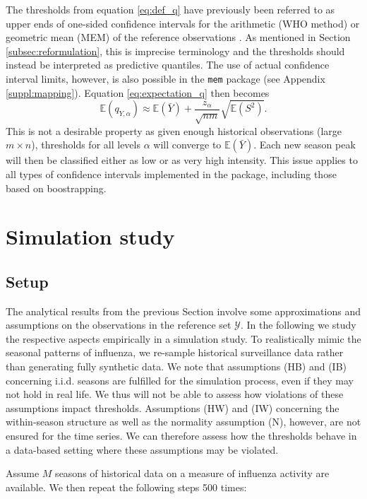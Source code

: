 \documentclass[12pt]{article}
\begin{document}
The thresholds from equation \eqref{eq:def_q} have previously been referred to as upper ends of one-sided confidence intervals for the arithmetic (WHO method) or geometric mean (MEM) of the reference observations \citep{WHO2014, Vega2015}. As mentioned in Section \ref{subsec:reformulation}, this is imprecise terminology and the thresholds should instead be interpreted as predictive quantiles. The use of actual confidence interval limits, however, is also possible in the \texttt{mem} package (see Appendix \ref{suppl:mapping}). Equation \eqref{eq:expectation_q} then becomes
$$
\mathbb{E}(q_{Y, \alpha}) \approx \mathbb{E}(\bar{Y}) + \frac{z_\alpha}{\sqrt{nm}} \sqrt{\mathbb{E}(S^2)}.
$$
This is not a desirable property as given enough historical observations (large $m \times n$), thresholds for all levels $\alpha$ will converge to $\mathbb{E}(\bar{Y})$. Each new season peak will then be classified either as low or as very high intensity. This issue applies to all types of confidence intervals implemented in the package, including those based on boostrapping.

\section{Simulation study}
\label{sec:simulation}

\subsection{Setup}
\label{subsec:simulation_setup}

The analytical results from the previous Section involve some approximations and assumptions on the observations in the reference set $\mathcal{Y}$. In the following we study the respective aspects empirically in a simulation study. To realistically mimic the seasonal patterns of influenza, we re-sample historical surveillance data rather than generating fully synthetic data. We note that assumptions (HB) and (IB) concerning i.i.d. seasons are fulfilled for the simulation process, even if they may not hold in real life. We thus will not be able to assess how violations of these assumptions impact thresholds. Assumptions (HW) and (IW) concerning the within-season structure as well as the normality assumption (N), however, are not ensured for the time series. We can therefore assess how the thresholds behave in a data-based setting where these assumptions may be violated.

Assume $M$ seasons of historical data on a measure of influenza activity are available. We then repeat the following steps 500 times:
\end{document}
